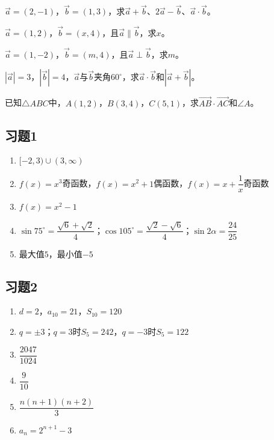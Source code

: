 \documentclass[a4paper,12pt]{ctexart}
\begin{document}

\begin{exercise}
\item $\vec a=(2,-1)$，$\vec b=(1,3)$，求$\vec a+\vec b$、$2\vec a-\vec b$、$\vec a\cdot\vec b$。
\item $\vec a=(1,2)$，$\vec b=(x,4)$，且$\vec a\parallel\vec b$，求$x$。
\item $\vec a=(1,-2)$，$\vec b=(m,4)$，且$\vec a\perp\vec b$，求$m$。
\item $|\vec a|=3$，$|\vec b|=4$，$\vec a$与$\vec b$夹角$60^\circ$，求$\vec a\cdot\vec b$和$|\vec a+\vec b|$。
\item 已知$\triangle ABC$中，$A(1,2)$，$B(3,4)$，$C(5,1)$，求$\overrightarrow{AB}\cdot\overrightarrow{AC}$和$\angle A$。
\end{exercise}

\newpage
{}

\subsection*{习题1}
\begin{enumerate}
  \item $[-2,3)\cup(3,\infty)$
  \item $f(x)=x^3$奇函数，$f(x)=x^2+1$偶函数，$f(x)=x+\dfrac1x$奇函数
  \item $f(x)=x^2-1$
  \item $\sin75^\circ=\dfrac{\sqrt6+\sqrt2}{4}$；$\cos105^\circ=\dfrac{\sqrt2-\sqrt6}{4}$；$\sin2\alpha=\dfrac{24}{25}$
  \item 最大值$5$，最小值$-5$
\end{enumerate}

\subsection*{习题2}
\begin{enumerate}
  \item $d=2$，$a_{10}=21$，$S_{10}=120$
  \item $q=\pm3$；$q=3$时$S_5=242$，$q=-3$时$S_5=122$
  \item $\dfrac{2047}{1024}$
  \item $\dfrac9{10}$
  \item $\dfrac{n(n+1)(n+2)}3$
  \item $a_n=2^{n+1}-3$
\end{enumerate}
\end{document}
